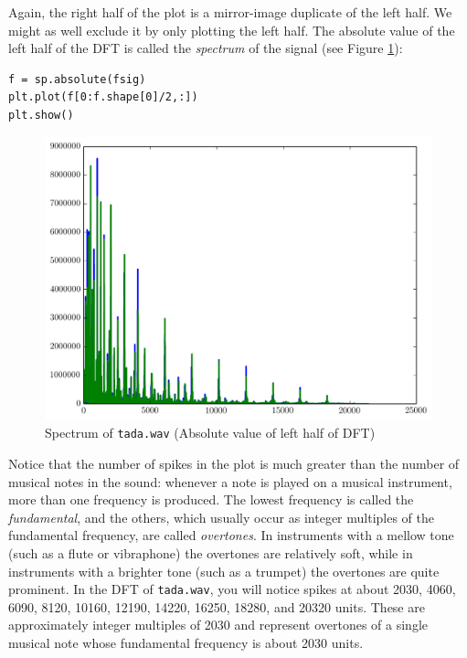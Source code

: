 Again, the right half of the plot is a mirror-image duplicate of the left half.
We might as well exclude it by only plotting the left half.
The absolute value of the left half of  the DFT is called the \emph{spectrum} of the signal (see Figure \ref{tadaspec2}):
\begin{lstlisting}
f = sp.absolute(fsig)
plt.plot(f[0:f.shape[0]/2,:])
plt.show()
\end{lstlisting}
\begin{figure}[ht]\caption{Spectrum of \texttt{tada.wav} (Absolute value of left half of DFT)}\label{tadaspec2}\centering\includegraphics[width=\textwidth]{tadaspec2}\end{figure}
Notice that the number of spikes in the plot is much greater than the number of musical notes in the sound: whenever a note is played on a musical instrument, more than one frequency is produced.
The lowest frequency is called the \emph{fundamental}, and the others, which usually occur as integer multiples of the fundamental frequency, are called \emph{overtones}.
In instruments with a mellow tone (such as a flute or vibraphone) the overtones are relatively soft, while in instruments with a brighter tone (such as a trumpet) the overtones are quite prominent.
In the DFT of \texttt{tada.wav}, you will notice spikes at about 2030, 4060, 6090, 8120, 10160, 12190, 14220, 16250, 18280, and 20320 units.
These are approximately integer multiples of 2030 and represent overtones of a single musical note whose fundamental frequency is about 2030 units.

